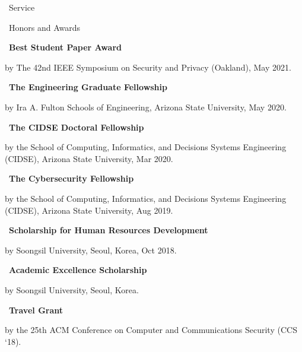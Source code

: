 \documentclass{resume} %
\begin{document}
\begin{rSection}{\faGenderless~Service}
	\vspace{3mm}
\end{rSection}

\begin{rSection}{\faGenderless~Honors and Awards}
	\strut\textbullet~{\bf Best Student Paper Award}\\
    \strut\hspace{1cm}\parbox[t]{\linegoal}{by The 42nd IEEE Symposium on Security and Privacy (Oakland), May 2021.}

    \strut\textbullet~{\bf The Engineering Graduate Fellowship}\\
    \strut\hspace{1cm}\parbox[t]{\linegoal}{by Ira A. Fulton Schools of Engineering, Arizona State University, May 2020.}

    \strut\textbullet~{\bf The CIDSE Doctoral Fellowship}\\
    \strut\hspace{1cm}\parbox[t]{\linegoal}{by the School of Computing, Informatics, and Decisions Systems Engineering (CIDSE), Arizona State University, Mar 2020.}

    \strut\textbullet~{\bf The Cybersecurity Fellowship}\\
    \strut\hspace{1cm}\parbox[t]{\linegoal}{by the School of Computing, Informatics, and Decisions Systems Engineering (CIDSE), Arizona State University, Aug 2019.}

	\strut\textbullet~{\bf Scholarship for Human Resources Development}\\
	\strut\hspace{1cm}by Soongsil University, Seoul, Korea, Oct 2018.


	\strut\textbullet~{\bf Academic Excellence Scholarship}\\
	\strut\hspace{1cm}by Soongsil University, Seoul, Korea.

	\strut\textbullet~{\bf Travel Grant}\\
	\strut\hspace{1cm}by the 25th ACM Conference on Computer and Communications Security (CCS `18).

	\vspace{3mm}
\end{rSection}
\end{document}
